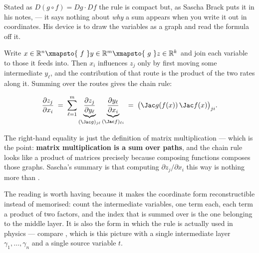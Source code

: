\begin{remark}
\label{rem:chain_rule_paths}
Stated as $D(g\circ f) = Dg\cdot Df$ the rule is compact but, as Sascha Brack puts it in his
notes,  --- it says nothing about \emph{why} a sum appears when you write
it out in coordinates. His device is to draw the variables as a graph and read the formula off
it.

Write $x \in \mathbb{R}^n \xmapsto{\ f\ } y \in \mathbb{R}^m \xmapsto{\ g\ } z \in \mathbb{R}^k$
and join each variable to those it feeds into. Then $x_i$ influences $z_j$ only by first moving
some intermediate $y_\ell$, and the contribution of that route is the product of the two rates
along it. Summing over the routes gives the chain rule:

\begin{center}
\end{center}

\[\frac{\partial z_j}{\partial x_i}
  \;=\; \sum_{\ell=1}^{m}
  \underbrace{\frac{\partial z_j}{\partial y_\ell}}_{(\Jac g)_{j\ell}}
  \underbrace{\frac{\partial y_\ell}{\partial x_i}}_{(\Jac f)_{\ell i}}
  \;=\; \big(\Jac g(f(x))\,\Jac f(x)\big)_{ji}.\]

The right-hand equality is just the definition of matrix multiplication --- which is the point:
\textbf{matrix multiplication is a sum over paths}, and the chain rule looks like a product of
matrices precisely because composing functions composes those graphs. Sascha's summary is that
computing $\partial z_j/\partial x_i$ this way is nothing more than .

The reading is worth having because it makes the coordinate form reconstructible instead of
memorised: count the intermediate variables, one term each, each term a product of two factors,
and the index that is summed over is the one belonging to the middle layer. It is also the
form in which the rule is actually used in physics --- compare
, which is this picture with a single intermediate layer
$\gamma_1,\dots,\gamma_n$ and a single source variable $t$.
\end{remark}

